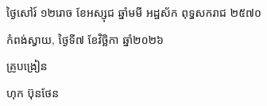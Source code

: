 \documentclass[a4paper,10pt]{article}
\begin{document}
\vspace{6pt}
{\centering
\hspace*{5.2cm}\begin{minipage}{11.5cm}
  \centering
  ថ្ងៃសៅរ៍ ១២រោច ខែអស្សុជ ឆ្នាំមមី អដ្ឋស័ក ពុទ្ធសករាជ ២៥៧០\par
  កំពង់ស្វាយ, ថ្ងៃទី៧ ខែវិច្ឆិកា ឆ្នាំ២០២៦\par
  \vspace{2pt}
  {\muol គ្រូបង្រៀន\par}
  \vspace{32pt}
  \hfill{\muol ហុក ប៊ុនថែន}\hspace*{1.4cm}
\end{minipage}\par}
\end{document}
